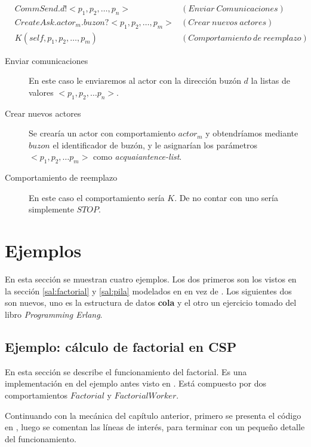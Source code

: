 \begin{align*}
&CommSend.d!<p_1, p_2, \ldots, p_n> & (Enviar\ Comunicaciones) \\ 
&CreateAsk.actor_m.buzon?<p_1, p_2, \ldots, p_m> & (Crear\ nuevos\ actores)\\
&K(self, p_1, p_2, \ldots, p_m)  & (Comportamiento\ de\ reemplazo)
\end{align*}

\begin{description}
\item [Enviar comunicaciones] En este caso le enviaremos al actor con la dirección buzón $d$ la listas de valores $<p_1, p_2, \ldots p_n>$. 
\item [Crear nuevos actores] Se crearía un actor con comportamiento $actor_m$ y obtendríamos mediante $buzon$ el identificador de buzón, y le asignarían los parámetros $<p_1, p_2, \ldots p_m>$ como \textit{acquaiantence-list}.
\item [Comportamiento de reemplazo] En este caso el comportamiento sería $K$. De no contar con uno sería simplemente $STOP$.
\end{description}

\section{Ejemplos}

En esta sección se muestran cuatro ejemplos. Los dos primeros son los vistos en la sección \ref{sal:factorial} y \ref{sal:pila} modelados en \CSP en vez de \SAL. Los siguientes dos son nuevos, uno es la estructura de datos \textbf{cola} y el otro un ejercicio tomado del libro \textit{Programming Erlang}\cite{Cesarini:2009:EP:1717841}.

\subsection{Ejemplo: cálculo de factorial en CSP}
En esta sección se describe el funcionamiento del factorial. Es una implementación en \CSP del ejemplo antes visto en \SAL. Está compuesto por dos comportamientos $Factorial$ y $FactorialWorker$.

Continuando con la mecánica del capítulo anterior, primero se presenta el código en \CSP, luego se comentan las líneas de interés, para terminar con un pequeño detalle del funcionamiento.

